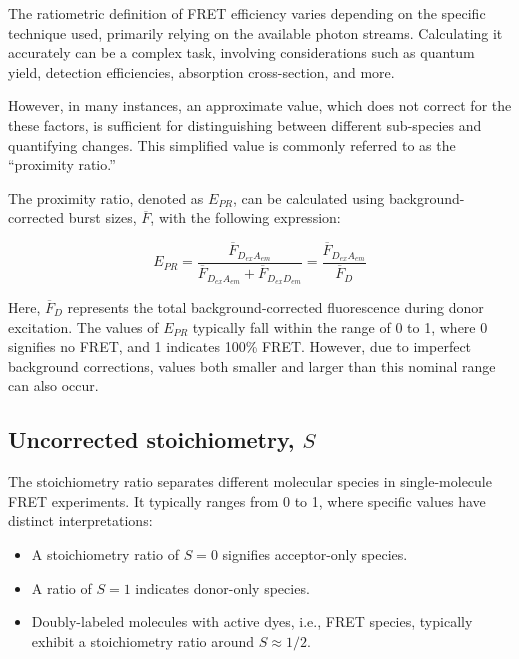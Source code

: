The ratiometric definition of FRET efficiency varies depending on the specific technique used, primarily relying on the available photon streams. Calculating it accurately can be a complex task, involving considerations such as quantum yield, detection efficiencies, absorption cross-section, and more.

However, in many instances, an approximate value, which does not correct for the these factors, is sufficient for distinguishing between different sub-species and quantifying changes. 
This simplified value is commonly referred to as the \enquote{proximity ratio.}

The proximity ratio, denoted as $E_{PR}$, can be calculated using background-corrected burst sizes, $\overline{F}$, with the following expression:

\begin{equation}
\label{eqn:Epr}
E_{PR}=\frac{\overline{F}_{D_{ex}A_{em}}}{\overline{F}_{D_{ex}A_{em}}+\overline{F}_{D_{ex}D_{em}}}=\frac{\overline{F}_{D_{ex}A_{em}}}{\overline{F}_D}
\end{equation}

\noindent
Here, $\overline{F}_D$ represents the total background-corrected fluorescence during donor excitation. 
The values of $E_{PR}$ typically fall within the range of 0 to 1, where 0 signifies no FRET, and 1 indicates 100\% FRET. 
However, due to imperfect background corrections, values both smaller and larger than this nominal range can also occur.

\subsection{Uncorrected stoichiometry, $S$}
\label{sec:uncorrected_S_apdx}

The stoichiometry ratio separates different molecular species in single-molecule FRET experiments. It typically ranges from 0 to 1, where specific values have distinct interpretations:

\begin{itemize}
    \item A stoichiometry ratio of $S = 0$ signifies acceptor-only species.
    \item A ratio of $S = 1$ indicates donor-only species.
    \item Doubly-labeled molecules with active dyes, i.e., FRET species, typically exhibit a stoichiometry ratio around $S \approx 1/2$.
\end{itemize}

